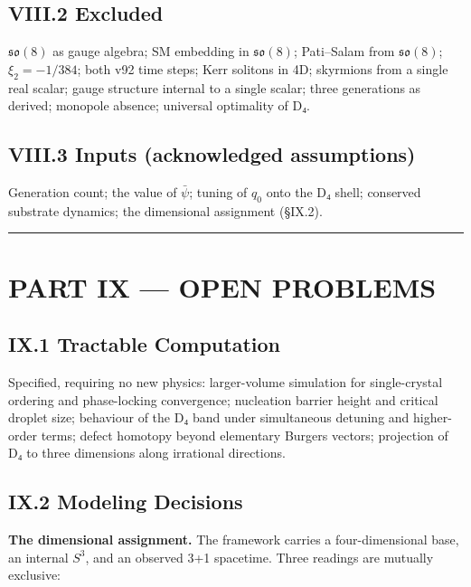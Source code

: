 \documentclass[a4paper,11pt]{article}
\begin{document}
\subsection*{VIII.2 Excluded}

$\mathfrak{so}(8)$ as gauge algebra; SM embedding in $\mathfrak{so}(8)$; Pati–Salam from $\mathfrak{so}(8)$; $\xi_2=-1/384$; both v92 time steps; Kerr solitons in 4D; skyrmions from a single real scalar; gauge structure internal to a single scalar; three generations as derived; monopole absence; universal optimality of D₄.

\subsection*{VIII.3 Inputs (acknowledged assumptions)}

Generation count; the value of $\bar\psi$; tuning of $q_0$ onto the D₄ shell; conserved substrate dynamics; the dimensional assignment (§IX.2).

\medskip\hrule\medskip

\section*{PART IX — OPEN PROBLEMS}

\subsection*{IX.1 Tractable Computation}

Specified, requiring no new physics: larger-volume simulation for single-crystal ordering and phase-locking convergence; nucleation barrier height and critical droplet size; behaviour of the D₄ band under simultaneous detuning and higher-order terms; defect homotopy beyond elementary Burgers vectors; projection of D₄ to three dimensions along irrational directions.

\subsection*{IX.2 Modeling Decisions}

\textbf{The dimensional assignment.} The framework carries a four-dimensional base, an internal $S^3$, and an observed 3+1 spacetime. Three readings are mutually exclusive:
\end{document}
